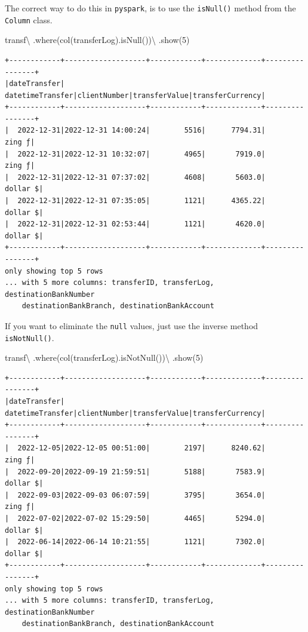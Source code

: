 \documentclass[
  11pt,
  letterpaper,
  DIV=11,
  numbers=noendperiod]{scrreprt}
\newenvironment{Shaded}{\begin{snugshade}}{\end{snugshade}}
\newcommand{\DecValTok}[1]{\textcolor[rgb]{0.68,0.00,0.00}{#1}}
\newcommand{\NormalTok}[1]{\textcolor[rgb]{0.00,0.23,0.31}{#1}}
\newcommand{\OperatorTok}[1]{\textcolor[rgb]{0.37,0.37,0.37}{#1}}
\newcommand{\StringTok}[1]{\textcolor[rgb]{0.13,0.47,0.30}{#1}}
\begin{document}
The correct way to do this in \texttt{pyspark}, is to use the
\texttt{isNull()} method from the \texttt{Column} class.

\begin{Shaded}
\begin{Highlighting}[]
\NormalTok{transf}\OperatorTok{\textbackslash{}}
\NormalTok{  .where(col(}\StringTok{\textquotesingle{}transferLog\textquotesingle{}}\NormalTok{).isNull())}\OperatorTok{\textbackslash{}}
\NormalTok{  .show(}\DecValTok{5}\NormalTok{)}
\end{Highlighting}
\end{Shaded}

\begin{verbatim}
+------------+-------------------+------------+-------------+----------------+
|dateTransfer|   datetimeTransfer|clientNumber|transferValue|transferCurrency|
+------------+-------------------+------------+-------------+----------------+
|  2022-12-31|2022-12-31 14:00:24|        5516|      7794.31|          zing ƒ|
|  2022-12-31|2022-12-31 10:32:07|        4965|       7919.0|          zing ƒ|
|  2022-12-31|2022-12-31 07:37:02|        4608|       5603.0|        dollar $|
|  2022-12-31|2022-12-31 07:35:05|        1121|      4365.22|        dollar $|
|  2022-12-31|2022-12-31 02:53:44|        1121|       4620.0|        dollar $|
+------------+-------------------+------------+-------------+----------------+
only showing top 5 rows
... with 5 more columns: transferID, transferLog, destinationBankNumber
    destinationBankBranch, destinationBankAccount
\end{verbatim}

If you want to eliminate the \texttt{null} values, just use the inverse
method \texttt{isNotNull()}.

\begin{Shaded}
\begin{Highlighting}[]
\NormalTok{transf}\OperatorTok{\textbackslash{}}
\NormalTok{  .where(col(}\StringTok{\textquotesingle{}transferLog\textquotesingle{}}\NormalTok{).isNotNull())}\OperatorTok{\textbackslash{}}
\NormalTok{  .show(}\DecValTok{5}\NormalTok{)}
\end{Highlighting}
\end{Shaded}

\begin{verbatim}
+------------+-------------------+------------+-------------+----------------+
|dateTransfer|   datetimeTransfer|clientNumber|transferValue|transferCurrency|
+------------+-------------------+------------+-------------+----------------+
|  2022-12-05|2022-12-05 00:51:00|        2197|      8240.62|          zing ƒ|
|  2022-09-20|2022-09-19 21:59:51|        5188|       7583.9|        dollar $|
|  2022-09-03|2022-09-03 06:07:59|        3795|       3654.0|          zing ƒ|
|  2022-07-02|2022-07-02 15:29:50|        4465|       5294.0|        dollar $|
|  2022-06-14|2022-06-14 10:21:55|        1121|       7302.0|        dollar $|
+------------+-------------------+------------+-------------+----------------+
only showing top 5 rows
... with 5 more columns: transferID, transferLog, destinationBankNumber
    destinationBankBranch, destinationBankAccount
\end{verbatim}
\end{document}

